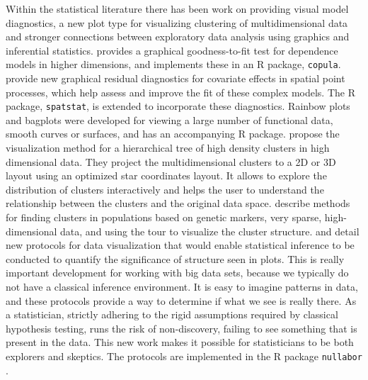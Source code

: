 \documentclass{article}
\begin{document}
Within the statistical literature there has been work on providing visual model diagnostics, a new plot type for visualizing clustering of multidimensional data and stronger connections between exploratory data analysis using graphics and inferential statistics. \citet{hofert2013graphical} provides a graphical goodness-to-fit test for dependence models in higher dimensions, and implements these in an R package, {\tt copula}. \citet{baddeley2013residual} provide new graphical residual diagnostics for covariate effects in spatial point processes, which help assess and improve the fit of these complex models. The R package, {\tt spatstat}, is extended to incorporate these diagnostics. Rainbow plots and bagplots \citep{rainbow} were developed for viewing a large number of functional data, smooth curves or surfaces, and has an accompanying R package. \citet{van2011visualizing} propose the visualization method for a hierarchical tree of high density clusters in high dimensional data. They project the multidimensional clusters to a 2D or 3D layout using an optimized star coordinates layout. It allows to explore the distribution of clusters interactively and helps the user to understand the relationship between the clusters and the original data space. \citet{newell} describe methods for finding clusters in populations based on genetic markers, very sparse, high-dimensional data, and using the tour \citep{As85} to visualize the cluster structure. \citet{buja:2009} and \citet{majumder:2013} detail new protocols for data visualization that would enable statistical inference to be conducted to quantify the significance of structure seen in plots. This is really important development for working with big data sets, because we typically do not have a classical inference environment. It is easy to imagine patterns in data, and these protocols provide a way to determine if what we see is really there. As a statistician, strictly adhering to the rigid assumptions required by classical hypothesis testing, runs the risk of non-discovery, failing to see something that is present in the data. This new work makes it possible for statisticians to be both explorers and skeptics. The protocols are implemented in the R package {\tt nullabor} \citep{nullabor}.


\end{document}
